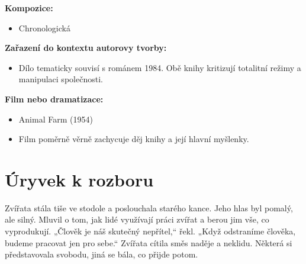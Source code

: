 \documentclass[12pt,a4paper]{article}
\begin{document}
\begin{tcolorbox}[breakable]
\textbf{Kompozice:}
\begin{itemize}
\item Chronologická
\end{itemize}

\textbf{Zařazení do kontextu autorovy tvorby:}
\begin{itemize}
\item Dílo tematicky souvisí s románem 1984. Obě knihy kritizují totalitní režimy a manipulaci společnosti.
\end{itemize}

\textbf{Film nebo dramatizace:}
\begin{itemize}
\item Animal Farm (1954)
\item Film poměrně věrně zachycuje děj knihy a její hlavní myšlenky.
\end{itemize}

\end{tcolorbox}

\section*{Úryvek k rozboru}

Zvířata stála tiše ve stodole a poslouchala starého kance. Jeho hlas byl pomalý, ale silný. Mluvil o tom, jak lidé využívají práci zvířat a berou jim vše, co vyprodukují. „Člověk je náš skutečný nepřítel,“ řekl. „Když odstraníme člověka, budeme pracovat jen pro sebe.“  
Zvířata cítila směs naděje a neklidu. Některá si představovala svobodu, jiná se bála, co přijde potom.
\end{document}
